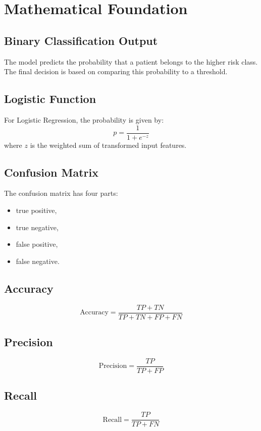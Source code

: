 \documentclass[12pt,a4paper,openany]{report}
\begin{document}
    \chapter{Mathematical Foundation}
    \section{Binary Classification Output}
    The model predicts the probability that a patient belongs to the higher risk class. The final decision is based on comparing this probability to a threshold.

    \section{Logistic Function}
    For Logistic Regression, the probability is given by:
    \begin{equation}
    p = \frac{1}{1 + e^{-z}}
    \end{equation}
    where $z$ is the weighted sum of transformed input features.

    \section{Confusion Matrix}
    The confusion matrix has four parts:
    \begin{itemize}[leftmargin=1.4cm]
    \item true positive,
    \item true negative,
    \item false positive,
    \item false negative.
    \end{itemize}

    \section{Accuracy}
    \begin{equation}
    \text{Accuracy} = \frac{TP + TN}{TP + TN + FP + FN}
    \end{equation}

    \section{Precision}
    \begin{equation}
    \text{Precision} = \frac{TP}{TP + FP}
    \end{equation}

    \section{Recall}
    \begin{equation}
    \text{Recall} = \frac{TP}{TP + FN}
    \end{equation}
\end{document}
